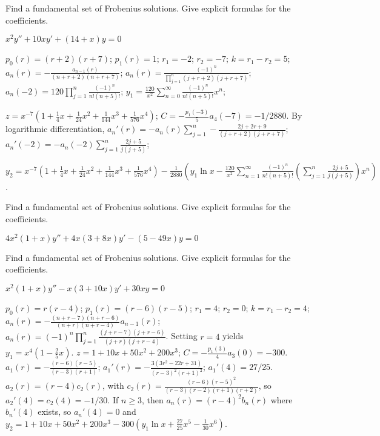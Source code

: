 \documentclass{ximera}
\begin{document}
\begin{problem}\label{exer:7.7.8}
Find
a fundamental set  of Frobenius solutions. Give explicit formulas for
the coefficients.

$x^2y''+10xy'+(14+x)y=0$

\begin{solution}
    $p_0(r)=(r+2)(r+7)$;
$p_1(r)=1$;
$r_1=-2$; $r_2=-7$; $k=r_1-r_2=5$;
$a_n(r)=-\frac{a_{n-1}(r)}{(n+r+2)(n+r+7)}$;
$a_n(r)=\frac{(-1)^n}{\prod_{j=1}^n(j+r+2)(j+r+7)}$;
$a_n(-2)=120\prod_{j=1}^n\frac{(-1)^n}{ n!(n+5)!}$;
$y_1=\frac{120}{ x^2}\sum_{n=0}^\infty\frac{(-1)^n}{
n!(n+5)!}x^n$;

$z=
x^{-7}\left(1+\frac{1}{4}x+\frac{1}{24}x^2+\frac{1}{144}x^3
+\frac{1}{576}x^4\right)$;
$C=-\frac{p_1(-3)}{5}a_4(-7)=-1/2880$.
By logarithmic differentiation,
$a_n'(r)=-a_n(r)\sum_{j=1}^n-\frac{2j+2r+9}{(j+r+2)(j+r+7)}$;
$a_n'(-2)=-a_n(-2)\sum_{j=1}^n\frac{2j+5}{ j(j+5)}$;

$y_2=x^{-7}\left(1+\frac{1}{4}x+\frac{1}{24}x^2+\frac{1}{144}x^3
+\frac{1}{576}x^4\right)-\frac{1}{2880}\left(y_1\ln x-\frac{120}{ x^2}
\sum_{n=1}^\infty\frac{(-1)^n}{
n!(n+5)!}\left(\sum_{j=1}^n\frac{2j+5}{ j(j+5)}\right)x^n\right)$.
\end{solution}
\end{problem}

\begin{problem}\label{exer:7.7.9}
Find
a fundamental set  of Frobenius solutions. Give explicit formulas for
the coefficients.

$4x^2(1+x)y''+4x(3+8x)y'-(5-49x)y=0$
\end{problem}

\begin{problem}\label{exer:7.7.10}
Find
a fundamental set  of Frobenius solutions. Give explicit formulas for
the coefficients.

$x^2(1+x)y''-x(3+10x)y'+30xy=0$

\begin{solution}
    $p_0(r)=r(r-4)$;
$p_1(r)=(r-6)(r-5)$;
$r_1=4$; $r_2=0$; $k=r_1-r_2=4$;
$a_n(r)=
-\frac{(n+r-7)(n+r-6)}{(n+r)(n+r-4)}
a_{n-1}(r)$;
 $a_n(r)=(-1)^n\prod_{j=1}^n\frac{(j+r-7)(j+r-6)}{(j+r)(j+r-4)}$.
Setting $r=4$ yields
$y_1=x^4\left(1-\frac{2}{5}x\right)$.
$z=1+10x+50x^2+200x^3$;
$C=-\frac{p_1(3)}{ 4}a_3(0)=-300$.
$a_1(r)=-\frac{(r-6)(r-5)}{(r-3)(r+1)}$;
$a_1'(r)=-\frac{3(3r^2-22r+31)}{(r-3)^2(r+1)^2}$;
$a_1'(4)=27/25$.
$a_2(r)=(r-4)c_2(r)$, with
$c_2(r)=\frac{(r-6)(r-5)^2}{(r-3)(r-2)(r+1)(r+2)}$, so
$a_2'(4)=c_2(4)=-1/30$.
If $n\geq 3$, then $a_n(r)=(r-4)^2b_n(r)$ where $b_n'(4)$ exists, so
$a_n'(4)=0$  and
$y_2=1+10x+50x^2+200x^3-300\left(y_1\ln
x+\frac{27}{25}x^5-\frac{1}{30}x^6\right)$.
\end{solution}
\end{problem}
\end{document}
